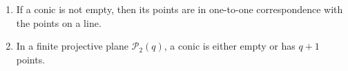 \begin{enumerate}
\item If a conic is not empty, then its points are in one-to-one correspondence with the points on a line.
\item In a finite projective plane $\mathcal{P}_2(q)$, a conic is either empty or has $q+1$ points.
\end{enumerate}
